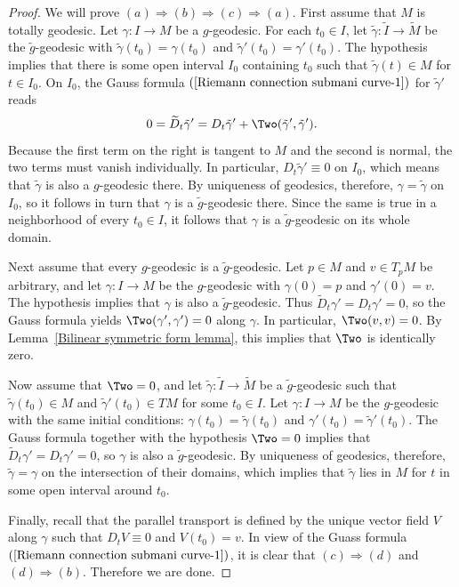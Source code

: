 \begin{proof}
We will prove $(a)\Rightarrow(b)\Rightarrow(c)\Rightarrow(a)$. First assume that $M$ is totally geodesic. Let $\gamma:I\to M$ be a $g$-geodesic. For each $t_0\in I$, let $\tilde{\gamma}:\widetilde{I}\to\widetilde{M}$ 
be the $\tilde{g}$-geodesic with $\tilde{\gamma}(t_0)=\gamma(t_0)$ and $\tilde{\gamma}'(t_0)=\gamma'(t_0)$. The hypothesis implies that there is some open 
interval $I_0$ containing $t_0$ such that $\tilde{\gamma}(t)\in M$ for $t\in I_0$. On $I_0$, the Gauss formula $(\ref{Riemann connection submani curve-1})$ 
for $\tilde{\gamma}'$ reads
\[0=\widetilde{D}_t\tilde{\gamma}'=D_t\tilde{\gamma}'+\Two(\tilde{\gamma}',\tilde{\gamma}').\]
Because the first term on the right is tangent to $M$ and the second is normal, the two terms must vanish individually. In particular, $D_t\tilde{\gamma}'\equiv 0$ on 
$I_0$, which means that $\tilde{\gamma}$ is also a $g$-geodesic there. By uniqueness of geodesics, therefore, $\gamma=\tilde{\gamma}$ on $I_0$, so it follows in 
turn that $\gamma$ is a $\tilde{g}$-geodesic there. Since the same is true in a neighborhood of every $t_0\in I$, it follows that $\gamma$ is a $\tilde{g}$-geodesic 
on its whole domain.\par
Next assume that every $g$-geodesic is a $\tilde{g}$-geodesic. Let $p\in M$ and $v\in T_pM$ be arbitrary, and let $\gamma:I\to M$ be the $g$-geodesic with $\gamma(0)=p$ 
and $\gamma'(0)=v$. The hypothesis implies that $\gamma$ is also a $\tilde{g}$-geodesic. Thus $\widetilde{D}_t\gamma'=D_t\gamma'=0$, so the Gauss formula yields 
$\Two(\gamma',\gamma')=0$ along $\gamma$. In particular, $\Two(v,v)=0$. By Lemma~\ref{Bilinear symmetric form lemma}, this implies that $\Two$ is identically zero.\par
Now assume that $\Two=0$, and let $\tilde{\gamma}:\widetilde{I}\to\widetilde{M}$ be a $\tilde{g}$-geodesic such that $\tilde{\gamma}(t_0)\in M$ and 
$\tilde{\gamma}'(t_0)\in TM$ for some $t_0\in I$. Let $\gamma:I\to M$ be the $g$-geodesic with the same initial conditions: $\gamma(t_0)=\tilde{\gamma}(t_0)$ 
and $\gamma'(t_0)=\tilde{\gamma}'(t_0)$. The Gauss formula together with the hypothesis $\Two=0$ implies that $\widetilde{D}_t\gamma'=D_t\gamma'=0$, so $\gamma$ is 
also a $\tilde{g}$-geodesic. By uniqueness of geodesics, therefore, $\tilde{\gamma}=\gamma$ on the intersection of their domains, which implies that $\tilde{\gamma}$ 
lies in $M$ for $t$ in some open interval around $t_0$.\par
Finally, recall that the parallel transport is defined by the unique vector field $V$ along $\gamma$ such that $D_tV\equiv 0$ and $V(t_0)=v$. In view of the Guass formula $(\ref{Riemann connection submani curve-1})$, 
it is clear that $(c)\Rightarrow(d)$ and $(d)\Rightarrow(b)$. Therefore we are done.
\end{proof}
